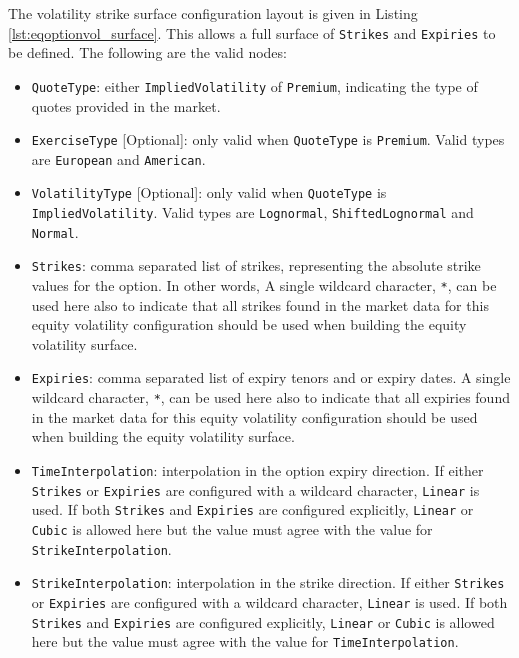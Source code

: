 \documentclass[12pt, a4paper]{article}
\begin{document}
{{The volatility strike surface configuration layout is given in Listing \ref{lst:eqoptionvol_surface}. This allows a full surface of \lstinline!Strikes! and \lstinline!Expiries! to be defined. The following are the valid nodes:

\begin{itemize}
\item
\lstinline!QuoteType!: either \lstinline!ImpliedVolatility! of \lstinline!Premium!, indicating the type of quotes provided in the market.

\item
\lstinline!ExerciseType! [Optional]: only valid when \lstinline!QuoteType! is \lstinline!Premium!. Valid types are \lstinline!European! and \lstinline!American!.

\item
\lstinline!VolatilityType! [Optional]: only valid when \lstinline!QuoteType! is \lstinline!ImpliedVolatility!. Valid types are \lstinline!Lognormal!, \lstinline!ShiftedLognormal! and \lstinline!Normal!.

\item
\lstinline!Strikes!: comma separated list of strikes, representing the absolute strike values for the option. In other words, A single wildcard character, \lstinline!*!, can be used here also to indicate that all strikes found in the market data for this equity volatility configuration should be used when building the equity volatility surface.

\item
\lstinline!Expiries!: comma separated list of expiry tenors and or expiry dates. A single wildcard character, \lstinline!*!, can be used here also to indicate that all expiries found in the market data for this equity volatility configuration should be used when building the equity volatility surface.

\item
\lstinline!TimeInterpolation!: interpolation in the option expiry direction. If either \lstinline!Strikes! or \lstinline!Expiries! are configured with a wildcard character, \lstinline!Linear! is used. If both \lstinline!Strikes! and \lstinline!Expiries! are configured explicitly, \lstinline!Linear! or \lstinline!Cubic! is allowed here but the value must agree with the value for \lstinline!StrikeInterpolation!.

\item
\lstinline!StrikeInterpolation!: interpolation in the strike direction. If either \lstinline!Strikes! or \lstinline!Expiries! are configured with a wildcard character, \lstinline!Linear! is used. If both \lstinline!Strikes! and \lstinline!Expiries! are configured explicitly, \lstinline!Linear! or \lstinline!Cubic! is allowed here but the value must agree with the value for \lstinline!TimeInterpolation!.


\end{itemize}}}
\end{document}
